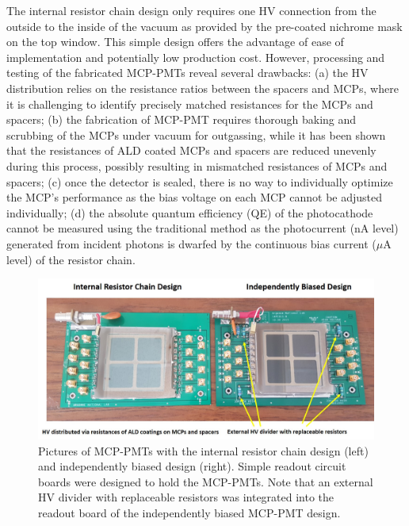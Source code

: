\documentclass[preprint,5p]{elsarticle}
\begin{document}
The internal resistor chain design only requires one HV connection from the outside to the 
inside of the vacuum as provided by the pre-coated nichrome mask on the 
top window. This simple design offers the advantage of ease of 
implementation and potentially low production cost. However, processing and testing of the 
fabricated MCP-PMTs reveal several drawbacks: (a) the HV distribution 
relies on the resistance ratios between the spacers and MCPs, where it is challenging 
to identify precisely matched resistances for the MCPs and spacers; (b) the 
fabrication of MCP-PMT requires thorough baking and scrubbing of the MCPs under 
vacuum for outgassing, while it has been shown that the resistances 
of ALD coated MCPs and spacers are reduced unevenly during this 
process, possibly resulting in mismatched resistances of MCPs and spacers; (c) 
once the detector is sealed, there is no way to individually optimize the MCP’s 
performance as the bias voltage on each MCP cannot be adjusted individually; (d) 
the absolute quantum efficiency (QE) of the photocathode cannot be measured 
using the traditional method as the photocurrent (nA level) generated from 
incident photons is dwarfed by the continuous bias current ($\mu$A level) of 
the resistor chain.      

\begin{figure}[tbp]
\centering \includegraphics[scale=0.7]{fig/Figure2.jpg}
 \caption{Pictures of MCP-PMTs with the internal resistor chain design (left) 
   and independently biased design (right). Simple readout circuit boards were 
   designed to hold the MCP-PMTs. Note that an external HV divider with 
   replaceable resistors was integrated into the readout board of the 
   independently biased MCP-PMT design. } \label{fig:pics}
\end{figure}
\end{document}

